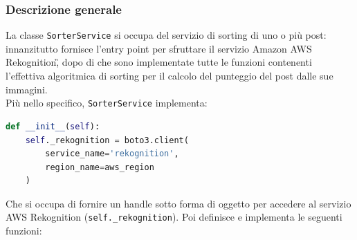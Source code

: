 \subsubsection{Descrizione generale}
La classe \verb+SorterService+ si occupa del servizio di sorting di uno o più post: innanzitutto fornisce l'entry point per sfruttare il servizio Amazon AWS Rekognition\G, dopo di che sono implementate tutte le funzioni contenenti l'effettiva algoritmica di sorting per il calcolo del punteggio del post dalle sue immagini.\\
Più nello specifico, \verb+SorterService+ implementa:
\begin{lstlisting}[language=Python]
def __init__(self):
    self._rekognition = boto3.client(
        service_name='rekognition', 
        region_name=aws_region
    )
\end{lstlisting} 
Che si occupa di fornire un handle sotto forma di oggetto per accedere al servizio AWS Rekognition
(\verb+self._rekognition+). 
Poi definisce e implementa le seguenti funzioni:
